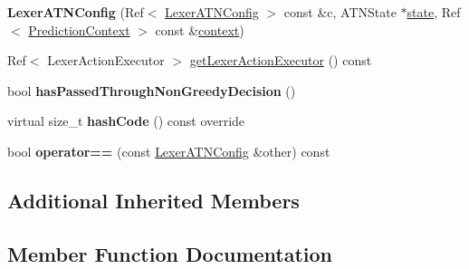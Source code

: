 \begin{DoxyCompactItemize}
\mbox{\label{classantlr4_1_1atn_1_1LexerATNConfig_a1ed789bdf745d52229924ed0a3336d4d}} 
{\bfseries Lexer\+A\+T\+N\+Config} (Ref$<$ \hyperlink{classantlr4_1_1atn_1_1LexerATNConfig}{Lexer\+A\+T\+N\+Config} $>$ const \&c, A\+T\+N\+State $\ast$\hyperlink{classantlr4_1_1atn_1_1ATNConfig_ae2e2757839f60f245b1a30c1f83bd52d}{state}, Ref$<$ \hyperlink{classantlr4_1_1atn_1_1PredictionContext}{Prediction\+Context} $>$ const \&\hyperlink{classantlr4_1_1atn_1_1ATNConfig_a1f30878a632f67672f16b52eefb01f26}{context})
\item 
Ref$<$ Lexer\+Action\+Executor $>$ \hyperlink{classantlr4_1_1atn_1_1LexerATNConfig_ad68d0e91f5556f0bb1f59a93fdee08bd}{get\+Lexer\+Action\+Executor} () const
\item 
\mbox{\label{classantlr4_1_1atn_1_1LexerATNConfig_aba7274ecab9937aa211ecda14004dbea}} 
bool {\bfseries has\+Passed\+Through\+Non\+Greedy\+Decision} ()
\item 
\mbox{\label{classantlr4_1_1atn_1_1LexerATNConfig_a0ed4e64c3fdce753b37952985f29a718}} 
virtual size\+\_\+t {\bfseries hash\+Code} () const override
\item 
\mbox{\label{classantlr4_1_1atn_1_1LexerATNConfig_ae05eaa27d4f920fd53a6ebd1ad5a767b}} 
bool {\bfseries operator==} (const \hyperlink{classantlr4_1_1atn_1_1LexerATNConfig}{Lexer\+A\+T\+N\+Config} \&other) const
\end{DoxyCompactItemize}
\subsection*{Additional Inherited Members}


\subsection{Member Function Documentation}
\mbox{\label{classantlr4_1_1atn_1_1LexerATNConfig_ad68d0e91f5556f0bb1f59a93fdee08bd}} 
